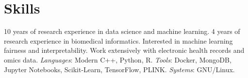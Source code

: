 \noindent \section*{Skills}
10 years of research experience in data science and machine learning. 
4 years of research experience in biomedical informatics. 
Interested in machine learning fairness and interpretability. 
Work extensively with electronic health records and omics data. 
\textit{Languages}: Modern C++, Python, R. 
\textit{Tools}: Docker, MongoDB, Jupyter Notebooks, Scikit-Learn, TensorFlow, PLINK.
\textit{Systems}: GNU/Linux.  
